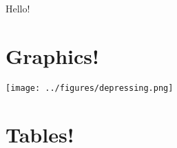 \documentclass{article}
\begin{document}
Hello!


\section{Graphics!}
\texttt{[image: ../figures/depressing.png]}

\section{Tables!}



\end{document}
